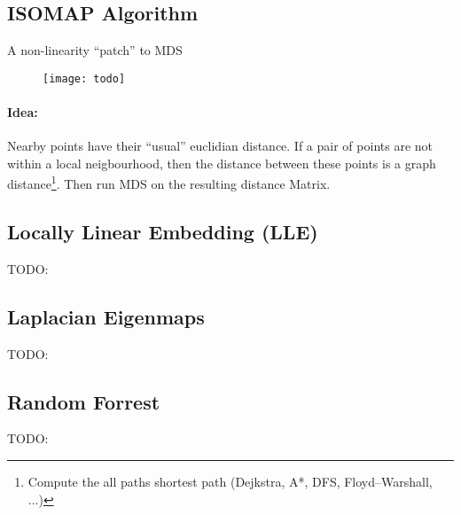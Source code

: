 \subsection*{ISOMAP Algorithm}
A non-linearity ``patch'' to MDS

\begin{figure}[H]
	\centering
	\texttt{[image: todo]}
\end{figure}

\paragraph{Idea:} Nearby points have their ``usual'' euclidian distance. If a pair of points are not within a local neigbourhood, then the distance between these points is a graph distance\footnote{Compute the all paths shortest path (Dejkstra, A*,  DFS, Floyd–Warshall, ...)}. Then run MDS on the resulting distance Matrix.

\subsection*{Locally Linear Embedding (LLE)}
TODO:

\subsection*{Laplacian Eigenmaps}
TODO:

\subsection*{Random Forrest}
TODO:
